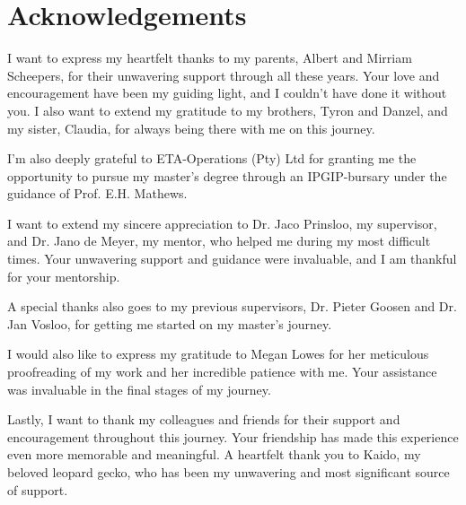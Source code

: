 
\cleardoublepage
{}
\chapter*{Acknowledgements}

I want to express my heartfelt thanks to my parents, Albert and Mirriam Scheepers, for their unwavering support through all these years. Your love and encouragement have been my guiding light, and I couldn't have done it without you. I also want to extend my gratitude to my brothers, Tyron and Danzel, and my sister, Claudia, for always being there with me on this journey. \par I'm also deeply grateful to ETA-Operations (Pty) Ltd for granting me the opportunity to pursue my master's degree through an IPGIP-bursary under the guidance of Prof. E.H. Mathews. \par I want to extend my sincere appreciation to Dr. Jaco Prinsloo, my supervisor, and Dr. Jano de Meyer, my mentor, who helped me during my most difficult times. Your unwavering support and guidance were invaluable, and I am thankful for your mentorship. \par A special thanks also goes to my previous supervisors, Dr. Pieter Goosen and Dr. Jan Vosloo, for getting me started on my master's journey. \par I would also like to express my gratitude to Megan Lowes for her meticulous proofreading of my work and her incredible patience with me. Your assistance was invaluable in the final stages of my journey. \par Lastly, I want to thank my colleagues and friends for their support and encouragement throughout this journey. Your friendship has made this experience even more memorable and meaningful. A heartfelt thank you to Kaido, my beloved leopard gecko, who has been my unwavering and most significant source of support.